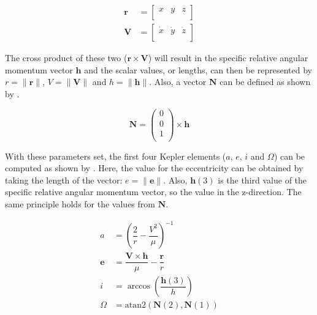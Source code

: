 \begin{equation}\label{eq:randvvectors}
\begin{split}
\mathbf{r}&=\begin{bmatrix}
x & y & z\\
\end{bmatrix}\\
\mathbf{V}&=\begin{bmatrix}
\dot{x} & \dot{y} & \dot{z}\\
\end{bmatrix}
\end{split}
\end{equation}

\noindent
The cross product of these two ($\mathbf{r}\times\mathbf{V}$) will result in the specific relative angular momentum vector $\mathbf{h}$ and the scalar values, or lengths, can then be represented by $r=\|\mathbf{r}\|$, $V=\|\mathbf{V}\|$ and $h=\|\mathbf{h}\|$. Also, a vector $\mathbf{N}$ can be defined as shown by \citep{noomen2013basic}.

\begin{equation}\label{eq:N}
\mathbf{N}=\begin{pmatrix}
0\\
0\\
1\\
\end{pmatrix}
\times
\mathbf{h}
\end{equation}

\noindent
With these parameters set, the first four Kepler elements ($a$, $e$, $i$ and $\Omega$) can be computed as shown by . Here, the value for the eccentricity can be obtained by taking the length of the vector: $e=\|\mathbf{e}\|$. Also, $\mathbf{h}(3)$ is the third value of the specific relative angular momentum vector, so the value in the z-direction. The same principle holds for the values from $\mathbf{N}$.

\begin{equation}\label{eq:carttokep4}
\begin{split}
a&=\left(\dfrac{2}{r}-\dfrac{V^{2}}{\mu}\right)^{-1}\\
\mathbf{e}&=\dfrac{\mathbf{V} \times \mathbf{h}}{\mu}-\dfrac{\mathbf{r}}{r}\\
i&=\arccos\left(\dfrac{\mathbf{h}(3)}{h}\right)\\
\Omega&=\text{atan}2\left(\mathbf{N}(2),\mathbf{N}(1)\right)
\end{split}
\end{equation}

